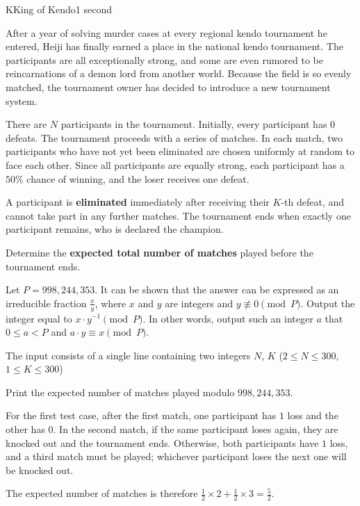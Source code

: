 \begin{problem}{K}{King of Kendo}{1 second}

\noindent
After a year of solving murder cases at every regional kendo tournament he entered, Heiji has finally earned a place in the national kendo tournament. The participants are all exceptionally strong, and some are even rumored to be reincarnations of a demon lord from another world. Because the field is so evenly matched, the tournament owner has decided to introduce a new tournament system.

\noindent
There are $N$ participants in the tournament. Initially, every participant has $0$ defeats. The tournament proceeds with a series of matches. In each match, two participants who have not yet been eliminated are chosen uniformly at random to face each other. Since all participants are equally strong, each participant has a $50\%$ chance of winning, and the loser receives one defeat.

\noindent
A participant is \textbf{eliminated} immediately after receiving their $K$-th defeat, and cannot take part in any further matches. The tournament ends when exactly one participant remains, who is declared the champion.

\noindent
Determine the \textbf{expected total number of matches} played before the tournament ends.

\noindent
Let $P = 998,244,353$. It can be shown that the answer can be expressed as an irreducible fraction $\frac{x}{y}$, where $x$ and $y$ are integers and $y \not\equiv 0 \pmod P$. Output the integer equal to $x\cdot y^{-1} \pmod P$. In other words, output such an integer $a$ that $0 \le a < P$ and $a\cdot y \equiv x \pmod P$.

\InputFile

\noindent
The input consists of a single line containing two integers $N$, $K$ ($2 \le N \le 300$, $1 \le K \le 300$)

\OutputFile

\noindent
Print the expected number of matches played modulo $998,244,353$.

\Examples

\begin{example}
\end{example}

\Note

\noindent
For the first test case, after the first match, one participant has $1$ loss and the other has $0$. In the second match, if the same participant loses again, they are knocked out and the tournament ends. Otherwise, both participants have $1$ loss, and a third match must be played; whichever participant loses the next one will be knocked out.

\noindent
The expected number of matches is therefore $\frac{1}{2} \times 2 + \frac{1}{2} \times 3 = \frac{5}{2}$.

\pagebreak

\end{problem}